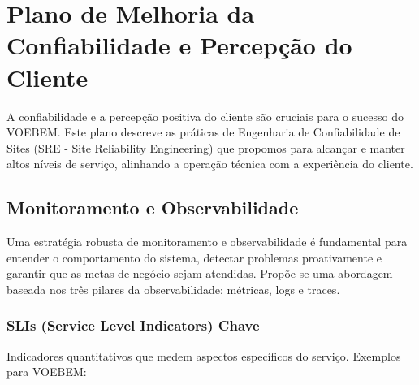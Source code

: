 \chapter{Plano de Melhoria da Confiabilidade e Percepção do Cliente}
\label{chap:confiabilidade-feedback}

A confiabilidade e a percepção positiva do cliente são cruciais para o sucesso do VOEBEM. Este plano descreve as práticas de Engenharia de Confiabilidade de Sites (SRE - Site Reliability Engineering) que propomos para alcançar e manter altos níveis de serviço, alinhando a operação técnica com a experiência do cliente.

\section{Monitoramento e Observabilidade}
\label{sec:monitoramento}

Uma estratégia robusta de monitoramento e observabilidade é fundamental para entender o comportamento do sistema, detectar problemas proativamente e garantir que as metas de negócio sejam atendidas. Propõe-se uma abordagem baseada nos três pilares da observabilidade: métricas, logs e traces.

\subsection{SLIs (Service Level Indicators) Chave}
\label{subsec:slis}
Indicadores quantitativos que medem aspectos específicos do serviço. Exemplos para VOEBEM:

